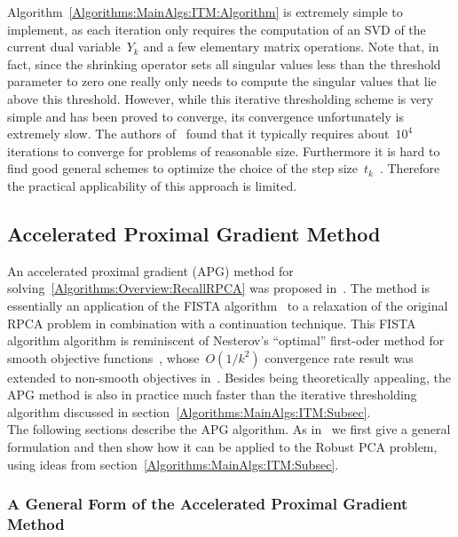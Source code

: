 \documentclass{../../common/projectreport}
\begin{document}
Algorithm~\ref{Algorithms:MainAlgs:ITM:Algorithm} is extremely simple to implement, as each iteration only requires the computation of an SVD of the current dual variable~$Y_k$ and a few elementary matrix operations. Note that, in fact, since the shrinking operator sets all singular values less than the threshold parameter to zero one really only needs to compute the singular values that lie above this threshold. However, while this iterative thresholding scheme is very simple and has been proved to converge, its convergence unfortunately is extremely slow. The authors of~\cite{Wright:2009fk} found that it typically requires about~$10^4$ iterations to converge for problems of reasonable size. Furthermore it is hard to find good general schemes to optimize the choice of the step size~$t_k$~\cite{Lin:2010fk}. Therefore the practical applicability of this approach is limited.


\subsection{Accelerated Proximal Gradient Method}
\label{Algorithms:MainAlgs:PGM:Subsec}

An accelerated proximal gradient (APG) method for solving~\eqref{Algorithms:Overview:RecallRPCA} was proposed in~\cite{Lin:2009kx}. The method is essentially an application of the FISTA algorithm~\cite{Beck:2009kx} to a relaxation of the original RPCA problem in combination with a continuation technique. This FISTA algorithm algorithm is reminiscent of Nesterov's ``optimal'' first-oder method for smooth objective functions~\cite{Nesterov:1983uq}, whose~$O(1/k^2)$ convergence rate result was extended to non-smooth objectives in~\cite{Nesterov:2007kx}. Besides being theoretically appealing, the APG method is also in practice much faster than the iterative thresholding algorithm discussed in section~\ref{Algorithms:MainAlgs:ITM:Subsec}.\\

The following sections describe the APG algorithm. As in~\cite{Lin:2009kx} we first give a general formulation and then show how it can be applied to the Robust PCA problem, using ideas from section~\ref{Algorithms:MainAlgs:ITM:Subsec}.


\subsubsection{A General Form of the Accelerated Proximal Gradient Method}
\label{Algorithms:MainAlgs:PGM:General:Subsubsec}
\end{document}

